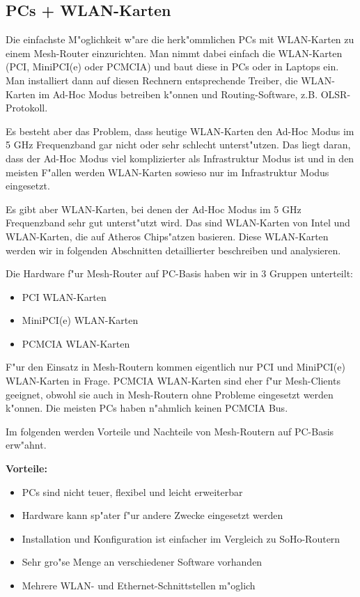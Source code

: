 \subsection{PCs + WLAN-Karten}

Die einfachste M"oglichkeit w"are die herk"ommlichen PCs mit
WLAN-Karten zu einem Mesh-Router einzurichten.  Man nimmt dabei
einfach die WLAN-Karten (PCI, MiniPCI(e) oder PCMCIA) und baut diese
in PCs oder in Laptops ein. Man installiert dann auf diesen Rechnern
entsprechende Treiber, die WLAN-Karten im Ad-Hoc Modus betreiben k"onnen
und Routing-Software, z.B. OLSR-Protokoll.

Es besteht aber das Problem, dass heutige WLAN-Karten den Ad-Hoc Modus im 5 GHz
Frequenzband gar nicht oder sehr schlecht unterst"utzen. Das liegt daran,
dass der Ad-Hoc Modus viel komplizierter als Infrastruktur Modus ist und
in den meisten F"allen werden WLAN-Karten sowieso nur im Infrastruktur Modus
eingesetzt.

Es gibt aber WLAN-Karten, bei denen der Ad-Hoc Modus im 5 GHz Frequenzband
sehr gut unterst"utzt wird. Das sind WLAN-Karten von Intel und WLAN-Karten,
die auf Atheros Chips"atzen basieren. Diese WLAN-Karten werden wir
in folgenden Abschnitten detaillierter beschreiben und analysieren.

Die Hardware f"ur Mesh-Router auf PC-Basis haben wir in 3 Gruppen unterteilt:

\begin{itemize}
\item PCI WLAN-Karten
\item MiniPCI(e) WLAN-Karten
\item PCMCIA WLAN-Karten
\end{itemize}

F"ur den Einsatz in Mesh-Routern kommen eigentlich nur PCI und MiniPCI(e)
WLAN-Karten in Frage. PCMCIA WLAN-Karten sind eher f"ur Mesh-Clients geeignet,
obwohl sie auch in Mesh-Routern ohne Probleme eingesetzt werden k"onnen.
Die meisten PCs haben n"ahmlich keinen PCMCIA Bus.

Im folgenden werden Vorteile und Nachteile von Mesh-Routern auf PC-Basis
erw"ahnt.

\textbf{Vorteile:}

\begin{itemize} 
\item PCs sind nicht teuer, flexibel und leicht erweiterbar
\item Hardware kann sp"ater f"ur andere Zwecke eingesetzt werden
\item Installation und Konfiguration ist einfacher im Vergleich zu SoHo-Routern
\item Sehr gro"se Menge an verschiedener Software vorhanden
\item Mehrere WLAN- und Ethernet-Schnittstellen m"oglich 
\end{itemize}

